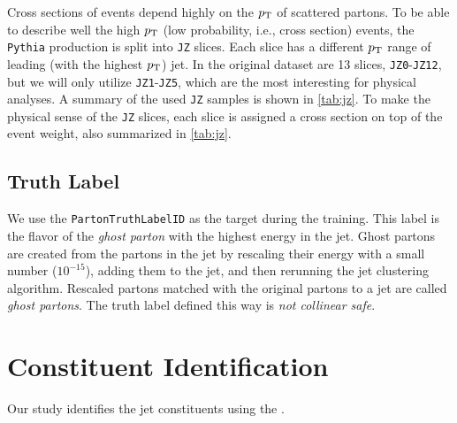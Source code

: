 Cross sections of events depend highly on the $p_\text{T}$ of scattered partons. 
To be able to describe well the high $p_\text{T}$ (low probability, i.e., cross section) events, the \MC \texttt{Pythia} production is split into \texttt{JZ} slices. 
Each slice has a different $p_\text{T}$ range of leading (with the highest $p_\text{T}$) jet.
In the original dataset are 13 slices, \texttt{JZ0}-\texttt{JZ12}, but we will only utilize \texttt{JZ1}-\texttt{JZ5}, which are the most interesting for physical analyses.
A summary of the used \texttt{JZ} samples is shown in \cref{tab:jz}. 
To make the physical sense of the \texttt{JZ} slices, each slice is assigned a cross section on top of the event weight, also summarized in \cref{tab:jz}.


\subsection{Truth Label}
We use the \texttt{PartonTruthLabelID} as the target during the training.
This label is the flavor of the \emph{ghost parton} with the highest energy in the jet.
Ghost partons are created from the partons in the jet by rescaling their energy with a small number ($10^{-15}$), adding them to the jet, and then rerunning the jet clustering algorithm.
Rescaled partons matched with the original partons to a jet are called \emph{ghost partons}.
The truth label defined this way is \emph{not collinear safe}.


\section{Constituent Identification}
\label{sec:pfo}
Our study identifies the jet constituents using the \PFa \cite{PFO}.

